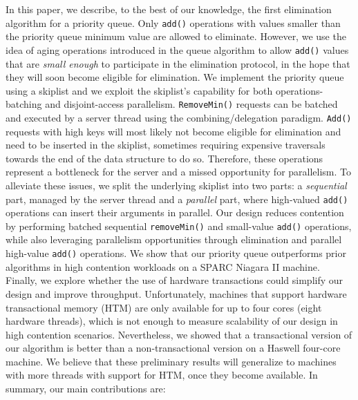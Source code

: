 In this paper, we describe, to the best of our knowledge, the first elimination algorithm for a priority queue.
Only \texttt{add()} operations with values smaller than the priority queue minimum value are allowed to eliminate. However, we use the idea of aging operations introduced in the queue algorithm to allow \texttt{add()} values that are \emph{small enough} to participate in the elimination protocol, in the hope that they will soon become eligible for elimination.
We implement the priority queue using a skiplist and we exploit the skiplist's capability for both operations-batching and disjoint-access parallelism. 
\texttt{RemoveMin()} requests can be batched and executed by a server thread using the combining/delegation paradigm. 
 \texttt{Add()} requests with high keys will most likely not become eligible for elimination and need to be inserted in the skiplist, sometimes requiring expensive traversals towards the end of the data structure to do so. Therefore, these operations represent a bottleneck for the server and a missed opportunity for parallelism. To alleviate these issues, we split the underlying skiplist into two parts: a \emph{sequential} part, managed by the server thread and a \emph{parallel} part, where high-valued \texttt{add()} operations can insert their arguments in parallel. Our design reduces contention by performing batched sequential \texttt{removeMin()} and small-value \texttt{add()} operations, while also leveraging parallelism opportunities through elimination and parallel high-value \texttt{add()} operations. We show that our priority queue outperforms prior algorithms in high contention workloads on a SPARC Niagara II machine. Finally, we explore whether the use of hardware transactions could simplify our design and improve throughput. Unfortunately, machines that support hardware transactional memory (HTM) are only available for up to four cores (eight hardware threads), which is not enough to measure scalability of our design in high contention scenarios. Nevertheless, we showed that a transactional version of our algorithm is better than a non-transactional version on a Haswell four-core machine. We believe that these preliminary results will generalize to machines with more threads with support for HTM, once they become available. In summary, our main contributions are:

